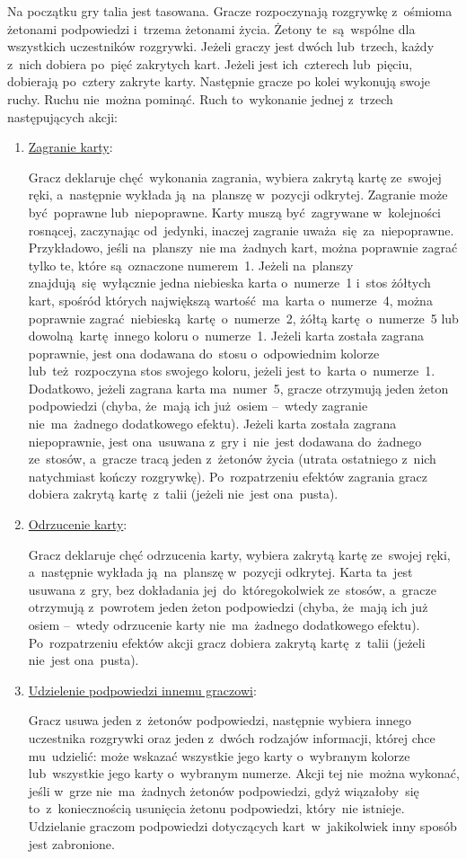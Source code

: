 \documentclass[declaration,shortabstract,inz]{iithesis}
\begin{document}
Na początku gry talia jest tasowana. Gracze rozpoczynają rozgrywkę z~ośmioma żetonami podpowiedzi i~trzema żetonami życia. Żetony te~są~wspólne dla wszystkich uczestników rozgrywki. Jeżeli graczy jest dwóch lub~trzech, każdy z~nich dobiera po~pięć zakrytych kart. Jeżeli jest ich~czterech lub~pięciu, dobierają po~cztery zakryte karty. Następnie gracze po kolei wykonują swoje ruchy. Ruchu nie~można pominąć. Ruch to~wykonanie jednej z~trzech następujących akcji:
\begin{enumerate}
	\item \underline{Zagranie karty}:

	Gracz deklaruje chęć wykonania zagrania, wybiera zakrytą kartę ze~swojej ręki, a~następnie wykłada ją~na~planszę w~pozycji odkrytej. Zagranie może być~poprawne lub~niepoprawne. Karty muszą być~zagrywane w~kolejności rosnącej, zaczynając od~jedynki, inaczej zagranie uważa~się za~niepoprawne. Przykładowo, jeśli na~planszy~nie ma~żadnych kart, można poprawnie zagrać tylko te, które są~oznaczone numerem~1. Jeżeli na~planszy znajdują~się wyłącznie jedna niebieska karta o~numerze~1 i~stos żółtych kart, spośród których największą wartość ma~karta o~numerze~4, można poprawnie zagrać niebieską kartę o~numerze~2, żółtą kartę o~numerze~5 lub dowolną kartę innego koloru o~numerze~1. Jeżeli karta została zagrana poprawnie, jest ona dodawana do~stosu o~odpowiednim kolorze lub~też~rozpoczyna stos swojego koloru, jeżeli jest to~karta o~numerze~1. Dodatkowo, jeżeli zagrana karta ma~numer~5, gracze otrzymują jeden żeton podpowiedzi (chyba, że~mają ich już osiem --~wtedy zagranie nie~ma~żadnego dodatkowego efektu). Jeżeli karta została zagrana niepoprawnie, jest ona~usuwana z~gry i~nie~jest dodawana do~żadnego ze~stosów, a~gracze tracą jeden z~żetonów życia (utrata ostatniego z~nich natychmiast kończy rozgrywkę). Po~rozpatrzeniu efektów zagrania gracz dobiera zakrytą kartę z~talii (jeżeli nie~jest ona~pusta).
	
	\item \underline{Odrzucenie karty}:
 
	Gracz deklaruje chęć odrzucenia karty, wybiera zakrytą kartę ze~swojej ręki, a~następnie wykłada ją~na~planszę w~pozycji odkrytej. Karta ta~jest usuwana z~gry, bez dokładania jej~do~któregokolwiek ze~stosów, a~gracze otrzymują z~powrotem jeden żeton podpowiedzi (chyba, że~mają ich już osiem --~wtedy odrzucenie karty nie~ma~żadnego dodatkowego efektu). Po~rozpatrzeniu efektów akcji gracz dobiera zakrytą kartę z~talii (jeżeli nie~jest ona~pusta).

	\item \underline{Udzielenie podpowiedzi innemu graczowi}:

	Gracz usuwa jeden z~żetonów podpowiedzi, następnie wybiera innego uczestnika rozgrywki oraz jeden z~dwóch rodzajów informacji, której chce mu~udzielić: może wskazać wszystkie jego karty o~wybranym kolorze lub~wszystkie jego karty o~wybranym numerze. Akcji tej nie~można wykonać, jeśli w~grze nie~ma~żadnych żetonów podpowiedzi, gdyż wiązałoby~się to~z~koniecznością usunięcia żetonu podpowiedzi, który~nie istnieje. Udzielanie graczom podpowiedzi dotyczących kart w~jakikolwiek inny sposób jest zabronione.
\end{enumerate}
\end{document}

